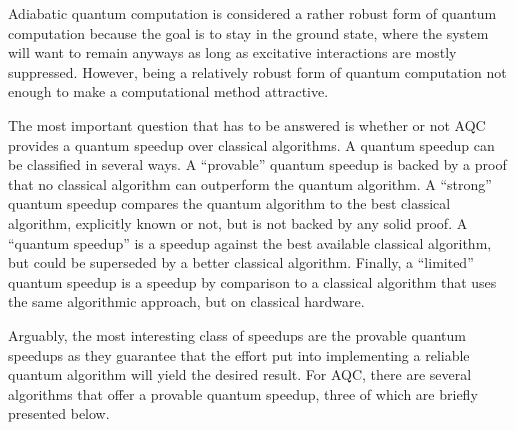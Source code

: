 \documentclass[%
 reprint,
 amsmath,amssymb,
 aps,
]{revtex4-1}
\begin{document}
   Adiabatic quantum computation is considered a rather robust form of quantum computation because the goal is to stay in the ground state, where the system will want to remain anyways as long as excitative interactions are mostly suppressed. However, being a relatively robust form of quantum computation not enough to make a computational method attractive. 
   
   The most important question that has to be answered is whether or not AQC provides a quantum speedup over classical algorithms. A quantum speedup can be classified in several ways\cite{RevModPhys.90.015002}. A ``provable'' quantum speedup is backed by a proof that no classical algorithm can outperform the quantum algorithm. A ``strong'' quantum speedup compares the quantum algorithm to the best classical algorithm, explicitly known or not, but is not backed by any solid proof. A ``quantum speedup'' is a speedup against the best available classical algorithm, but could be superseded by a better classical algorithm. Finally, a ``limited'' quantum speedup is a speedup by comparison to a classical algorithm that uses the same algorithmic approach, but on classical hardware.
   
   Arguably, the most interesting class of speedups are the provable quantum speedups as they guarantee that the effort put into implementing a reliable quantum algorithm will yield the desired result. For AQC, there are several algorithms that offer a provable quantum speedup, three of which are briefly presented below.
   
\end{document}
